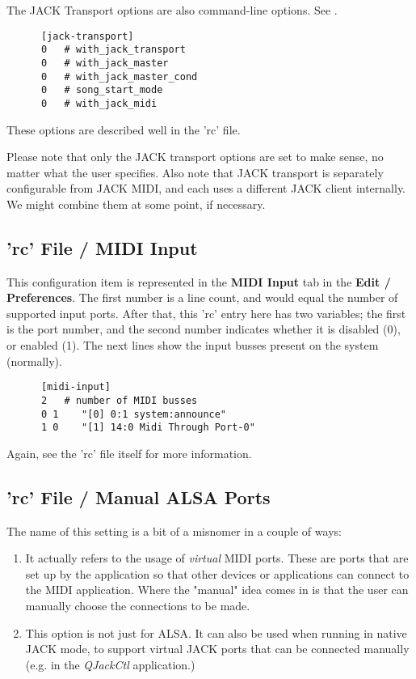    The JACK Transport options are also command-line options.
   See .

   \begin{verbatim}
      [jack-transport]
      0   # with_jack_transport
      0   # with_jack_master
      0   # with_jack_master_cond
      0   # song_start_mode
      0   # with_jack_midi
   \end{verbatim}

   These options are described well in the 'rc' file.

   Please note that only the JACK transport options are set to make sense, no
   matter what the user specifies.
   Also note that JACK transport is separately configurable from
   JACK MIDI, and each uses a different JACK client internally.
   We might combine them at some point, if necessary.

\subsection{'rc' File / MIDI Input}
\label{subsec:configuration_midi_input}

   This configuration item is represented in the
   \textbf{MIDI Input} tab in the \textbf{Edit / Preferences}.
   The first number is a line count, and would equal the number of
   supported input ports.
   After that, this 'rc' entry here has two variables;
   the first is the port number,
   and the second number indicates whether it is disabled (0), or enabled (1).
   The next lines show the input busses present on the system (normally).

   \begin{verbatim}
      [midi-input]
      2   # number of MIDI busses
      0 1    "[0] 0:1 system:announce"
      1 0    "[1] 14:0 Midi Through Port-0"
   \end{verbatim}

   Again, see the 'rc' file itself for more information.

\subsection{'rc' File / Manual ALSA Ports}
\label{subsec:configuration_manual_ports}

   The name of this setting is a bit of a misnomer in a couple of ways:

   \begin{enumerate}
      \item It actually refers to the usage of \textsl{virtual} MIDI ports.
         These are ports that are set up by the application so that other
         devices or applications can connect to the MIDI application.
         Where the "manual" idea comes in is that the user can manually choose
         the connections to be made.
      \item This option is not just for ALSA.  It can also be used when
         running in native JACK mode, to support
         virtual JACK ports that can be connected manually (e.g. in the
         \textsl{QJackCtl} application.)
   \end{enumerate}

